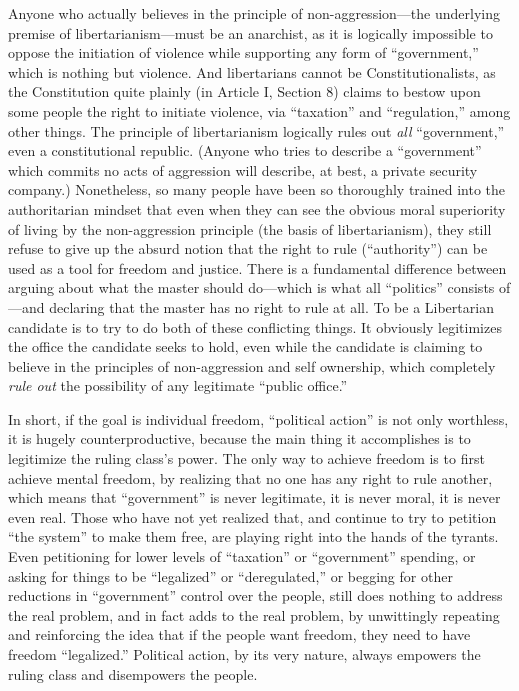 \documentclass{book}
\begin{document}
Anyone who actually believes in the principle of non-aggression---the underlying premise of libertarianism---must be an anarchist, as it is logically impossible to oppose the initiation of violence while supporting any form of \enquote{government,} which is nothing but violence. And libertarians cannot be Constitutionalists, as the Constitution quite plainly (in Article I, Section 8) claims to bestow upon some people the right to initiate violence, via \enquote{taxation} and \enquote{regulation,} among other things. The principle of libertarianism logically rules out \emph{all} \enquote{government,} even a constitutional republic. (Anyone who tries to describe a \enquote{government} which commits no acts of aggression will describe, at best, a private security company.) Nonetheless, so many people have been so thoroughly trained into the authoritarian mindset that even when they can see the obvious moral superiority of living by the non-aggression principle (the basis of libertarianism), they still refuse to give up the absurd notion that the right to rule (\enquote{authority}) can be used as a tool for freedom and justice. There is a fundamental difference between arguing about what the master should do---which is what all \enquote{politics} consists of---and declaring that the master has no right to rule at all. To be a Libertarian candidate is to try to do both of these conflicting things. It obviously legitimizes the office the candidate seeks to hold, even while the candidate is claiming to believe in the principles of non-aggression and self ownership, which completely \emph{rule out} the possibility of any legitimate \enquote{public office.}

In short, if the goal is individual freedom, \enquote{political action} is not only worthless, it is hugely counterproductive, because the main thing it accomplishes is to legitimize the ruling class's power. The only way to achieve freedom is to first achieve mental freedom, by realizing that no one has any right to rule another, which means that \enquote{government} is never legitimate, it is never moral, it is never even real. Those who have not yet realized that, and continue to try to petition \enquote{the system} to make them free, are playing right into the hands of the tyrants. Even petitioning for lower levels of \enquote{taxation} or \enquote{government} spending, or asking for things to be \enquote{legalized} or \enquote{deregulated,} or begging for other reductions in \enquote{government} control over the people, still does nothing to address the real problem, and in fact adds to the real problem, by unwittingly repeating and reinforcing the idea that if the people want freedom, they need to have freedom \enquote{legalized.} Political action, by its very nature, always empowers the ruling class and disempowers the people.
\end{document}
